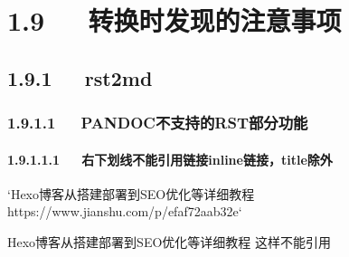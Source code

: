 \documentclass[letterpaper,12pt,english]{sphinxmanual}
\begin{document}
\section{1.9   转换时发现的注意事项}
\label{\detokenize{001software/001install/pandoc:id14}}

\subsection{1.9.1   rst2md}
\label{\detokenize{001software/001install/pandoc:rst2md}}

\subsubsection{1.9.1.1   PANDOC不支持的RST部分功能}
\label{\detokenize{001software/001install/pandoc:pandocrst}}

\paragraph{1.9.1.1.1   右下划线不能引用链接inline链接，title除外}
\label{\detokenize{001software/001install/pandoc:inline-title}}
\begin{sphinxVerbatim}[commandchars=\\\{\}]
{}`Hexo博客从搭建部署到SEO优化等详细教程 \PYGZlt{}https://www.jianshu.com/p/efaf72aab32e\PYGZgt{}{}`\PYGZus{}

Hexo博客从搭建部署到SEO优化等详细教程\PYGZus{}
这样不能引用
\end{sphinxVerbatim}
\end{document}

